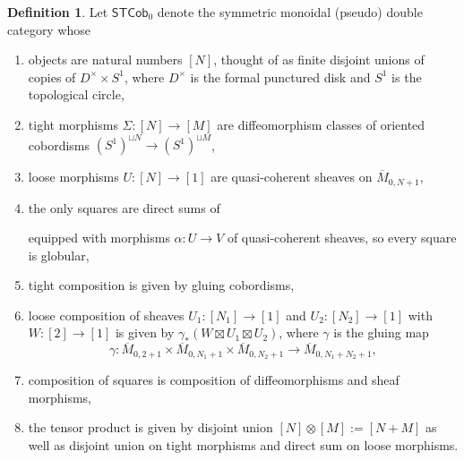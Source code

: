 \documentclass[11pt]{report}
\theoremstyle{definition}
\newtheorem{definition}[theorem]{Definition}
\theoremstyle{remark}
\theoremstyle{remark}
\newcommand{\id}{\textnormal{id}}
\begin{document}
\begin{definition}
Let $\mathsf{STCob}_0$ denote the symmetric monoidal (pseudo) double category whose
\begin{enumerate}[label=(\roman*)]
\item objects are natural numbers $[N]$, thought of as finite disjoint unions of copies of $D^\times \times S^1$, where $D^\times$ is the formal punctured disk and $S^1$ is the topological circle,
\item tight morphisms $\Sigma: [N] \to [M]$ are diffeomorphism classes of oriented cobordisms $(S^1)^{\sqcup N} \to (S^1)^{\sqcup M}$,
\item loose morphisms $U: [N] \to [1]$ are quasi-coherent sheaves on $\overline{M}_{0,N+1}$,
\item the only squares are direct sums of
\begin{center}
\end{center}
equipped with morphisms $\alpha: U \to V$ of quasi-coherent sheaves, so every square is globular,
\item tight composition is given by gluing cobordisms,
\item loose composition of sheaves $U_1: [N_1] \to [1]$ and $U_2: [N_2] \to [1]$ with $W: [2] \to [1]$ is given by $\gamma_*(W \boxtimes U_1 \boxtimes U_2)$, where $\gamma$ is the gluing map
\begin{equation*}
\gamma: \overline{M}_{0,2+1} \times \overline{M}_{0,N_1+1} \times \overline{M}_{0,N_2+1} \to \overline{M}_{0,N_1+N_2+1},
\end{equation*}
\item composition of squares is composition of diffeomorphisms and sheaf morphisms,
\item the tensor product is given by disjoint union $[N] \otimes [M] := [N+M]$ as well as disjoint union on tight morphisms and direct sum on loose morphisms.
\end{enumerate}
\end{definition}
\end{document}
